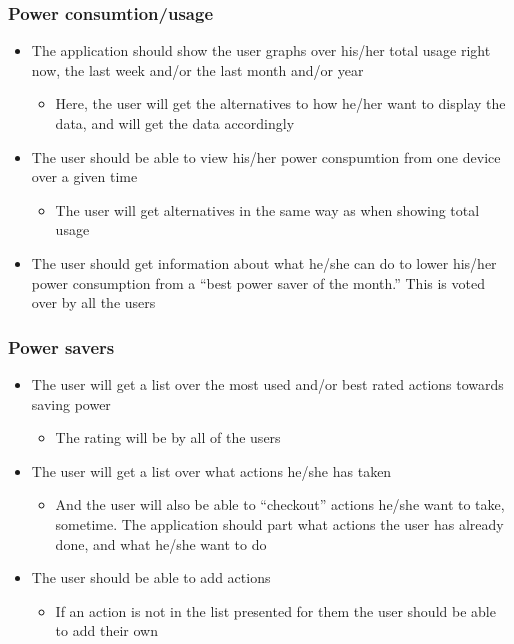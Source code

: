 \begin{itemize}
\subsubsection{Power consumtion/usage}

\begin{itemize}
\item The application should show the user graphs over his/her total usage right now, the last week and/or the last month and/or year
\begin{itemize}
\item Here, the user will get the alternatives to how he/her want to display the data, and will get the data accordingly
\end{itemize}
\item The user should be able to view his/her power conspumtion from one device over a given time
\begin{itemize}
\item The user will get alternatives in the same way as when showing total usage
\end{itemize}
\item The user should get information about what he/she can do to lower his/her power consumption from a “best power saver of the month.” This is voted over by all the users
\end{itemize}

\subsubsection{Power savers}

\begin{itemize}
\item The user will get a list over the most used and/or best rated actions towards saving power
\begin{itemize}
\item The rating will be by all of the users
\end{itemize}
\item The user will get a list over what actions he/she has taken
\begin{itemize}
\item And the user will also be able to “checkout” actions he/she want to take, sometime. The application should part what actions the user has already done, and what he/she want to do
\end{itemize}
\item The user should be able to add actions
\begin{itemize}
\item If an action is not in the list presented for them the user should be able to add their own
\end{itemize}
\end{itemize}



\end{itemize}

